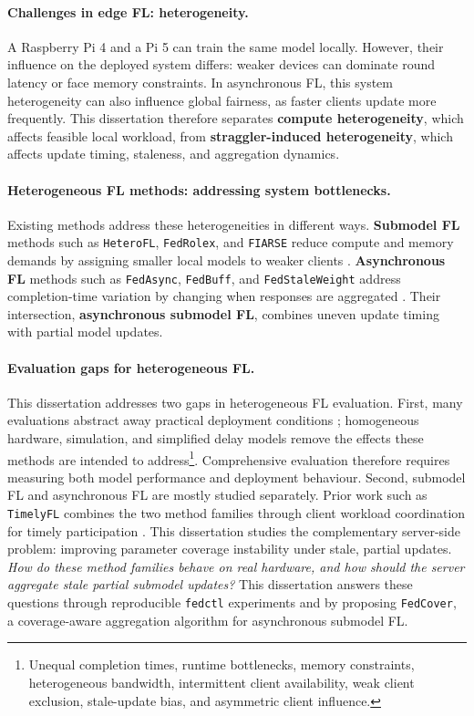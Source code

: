 \paragraph{Challenges in edge FL: heterogeneity.}
A Raspberry Pi 4 and a Pi 5 can train the same model locally. However, their influence on the deployed system differs: weaker devices can dominate round latency or face memory constraints. In asynchronous FL, this system heterogeneity can also influence global fairness, as faster clients update more frequently. This dissertation therefore separates \textbf{compute heterogeneity}, which affects feasible local workload, from \textbf{straggler-induced heterogeneity}, which affects update timing, staleness, and aggregation dynamics.

\paragraph{Heterogeneous FL methods: addressing system bottlenecks.}
Existing methods address these heterogeneities in different ways. \textbf{Submodel FL} methods such as \texttt{HeteroFL}, \texttt{FedRolex}, and \texttt{FIARSE} reduce compute and memory demands by assigning smaller local models to weaker clients \parencite{diao2021heterofl,alam2022fedrolex,wu2024fiarse}. \textbf{Asynchronous FL} methods such as \texttt{FedAsync}, \texttt{FedBuff}, and \texttt{FedStaleWeight} address completion-time variation by changing when responses are aggregated \parencite{xie2019asynchronous,nguyen2022fedbuff,ma2024fedstaleweight}. Their intersection, \textbf{asynchronous submodel FL}, combines uneven update timing with partial model updates.

\paragraph{Evaluation gaps for heterogeneous FL.}
This dissertation addresses two gaps in heterogeneous FL evaluation. First, many evaluations abstract away practical deployment conditions \parencite{wang2021field,diao2021heterofl,alam2022fedrolex,nguyen2022fedbuff,lai2022fedscale}; homogeneous hardware, simulation, and simplified delay models remove the effects these methods are intended to address\footnote{Unequal completion times, runtime bottlenecks, memory constraints, heterogeneous bandwidth, intermittent client availability, weak client exclusion, stale-update bias, and asymmetric client influence.}. Comprehensive evaluation therefore requires measuring both model performance and deployment behaviour. Second, submodel FL and asynchronous FL are mostly studied separately. Prior work such as \texttt{TimelyFL} combines the two method families through client workload coordination for timely participation \parencite{zhang2023timelyfl}. This dissertation studies the complementary server-side problem: improving parameter coverage instability under stale, partial updates. \textit{How do these method families behave on real hardware, and how should the server aggregate stale partial submodel updates?} This dissertation answers these questions through reproducible \texttt{fedctl} experiments and by proposing \texttt{FedCover}, a coverage-aware aggregation algorithm for asynchronous submodel FL.

